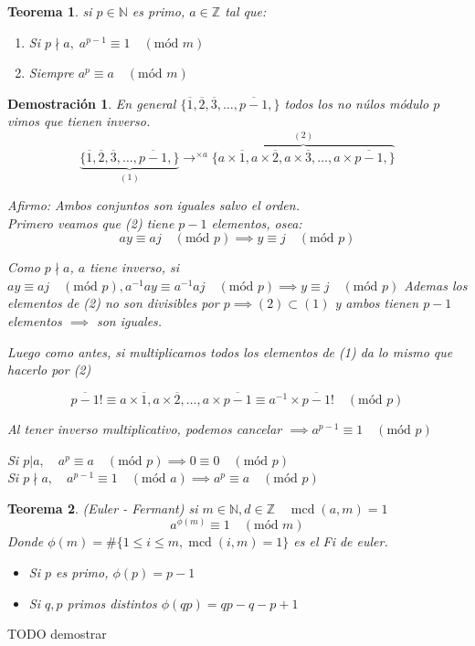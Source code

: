 \documentclass[9pt,a4paper,draft]{article}
\theoremstyle{definition}
\theoremstyle{plain}
\newtheorem{teo}{Teorema}
\newtheorem{demo}{Demostración}[teo]
\DeclareMathOperator{\mcd}{mcd}
\newcommand{\modu}[1]{\quad(\text{mód }#1)}
\begin{document}
\begin{teo} si $p\in{\mathbb{N}}$ es primo, $a\in{\mathbb{Z}}$ tal que:
\begin{enumerate}
\item Si $p\nmid a,\; a^{p-1}\equiv1\modu{m}$
\item Siempre $a^p\equiv a\modu{m}$
\end{enumerate}
\end{teo}

\begin{demo}
En general $\{\overline{1},\overline{2},\overline{3},\dots, \overline{p-1},\}$ todos los no núlos módulo $p$ vimos que tienen inverso.
$$\underbrace{\{\overline{1},\overline{2},\overline{3},\dots, \overline{p-1},\}}_{(1)} \to^{\times{a}} \overbrace{\{a\times\overline{1},a\times\overline{2},a\times\overline{3},\dots, a\times\overline{p-1},\}}^{(2)}$$

Afirmo: Ambos conjuntos son iguales salvo el orden.\\
Primero veamos que (2) tiene $p-1$ elementos, osea:
$$ay\equiv aj\modu{p}\implies y\equiv j\modu{p}$$

Como $p\nmid a$, $a$ tiene inverso, si $ay\equiv aj\modu{p}, a^{-1}ay \equiv a^{-1}aj\modu{p} \implies y\equiv j\modu{p}$
Ademas los elementos de (2) no son divisibles por $p\implies(2)\subset(1)$ y ambos tienen $p-1$ elementos $\implies$ son iguales.

Luego como antes, si multiplicamos todos los elementos de (1) da lo mismo que hacerlo por (2)

$$ \overline{p-1}! \equiv a\times\overline{1}, a\times\overline{2}, \dots, a\times\overline{p-1} \equiv a^{-1}\times\overline{p-1}! \modu{p}$$

Al tener inverso multiplicativo, podemos cancelar $\implies a^{p-1}\equiv1\modu{p}$

Si $p|a,\quad a^p\equiv a \modu{p} \implies 0\equiv0\modu{p}$\\
Si $p\nmid a, \quad a^{p-1}\equiv1\modu{a} \implies a^p\equiv a\modu{p}$
\end{demo}

\begin{teo} (Euler - Fermant) si $m\in{\mathbb{N}}, d\in{\mathbb{Z}} \quad \mcd(a,m)=1$
$$a^{\phi(m)}\equiv1\modu{m}$$
Donde $\phi(m)=\#\{1\leq{i}\leq{m}, \mcd(i,m)=1\}$ es el Fi de euler.
\begin{itemize}
\item Si $p$ es primo, $\phi(p)=p-1$
\item Si $q,p$ primos distintos $\phi(qp)=qp-q-p+1$
\end{itemize}
\end{teo} TODO demostrar
\end{document}
